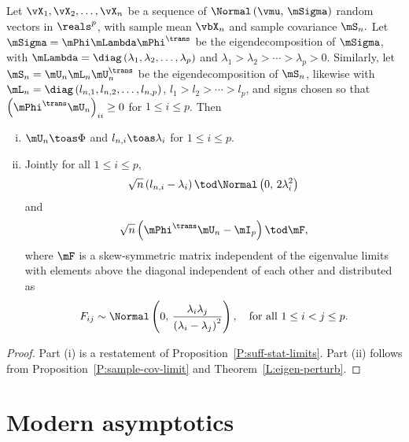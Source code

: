 \begin{theorem}
Let $\vX_1, \vX_2, \ldots, \vX_n$ be a sequence of \iid 
\(
    \Normal \left(
        \vmu, \,
        \mSigma
    \right)
\)
random vectors in $\reals^p$, with sample mean
\(
    \vbX_n
\)
and sample covariance
\(
    \mS_n.
\)
Let $\mSigma = \mPhi \mLambda \mPhi^\trans$ be the eigendecomposition
of $\mSigma$, with
\(
    \mLambda = \diag \left(
        \lambda_1,
        \lambda_2,
        \ldots,
        \lambda_p
    \right)
\)
and
\(
    \lambda_1 > \lambda_2 > \cdots > \lambda_p > 0
\).
Similarly, let $\mS_n = \mU_n \mL_n \mU_n^\trans$ be the eigendecomposition of $\mS_n$, likewise with
\(
    \mL_n = \diag \left(
        l_{n,1},
        l_{n,2},
        \ldots,
        l_{n,p}
    \right)
\),
\(
    l_1 > l_2 > \cdots > l_p
\),
and signs chosen so that
\(
    \left( \mPhi^\trans \mU_n \right)_{ii} \geq 0
\)
for $1 \leq i \leq p$.  Then
\begin{enumerate}[(i)]
    \item $\mU_n \toas \Phi$ and $l_{n,i} \toas \lambda_i$ for
        $1 \leq i \leq p$.
    \item Jointly for all $1 \leq i \leq p$,
        \[
            \sqrt{n} \left( l_{n,i} - \lambda_i \right) 
            \tod 
            \Normal\left( 0, \, 2 \lambda_i^2 \right)
        \]
        and
        \[
            \sqrt{n} \left( \mPhi^\trans \mU_n - \mI_p \right) \tod \mF,
        \]
        where $\mF$ is a skew-symmetric matrix independent of the
        eigenvalue limits with elements above the diagonal independent of
        each other and distributed as 
        \[
            F_{ij}
            \sim
            \Normal \left(
                0, \,
                \frac{\lambda_i \lambda_j}
                     {\left( \lambda_i - \lambda_j \right)^2}
            \right),
            \quad
            \text{for all $1 \leq i < j \leq p$.}
        \]
\end{enumerate}
\end{theorem}
\begin{proof}
Part (i) is a restatement of Proposition~\ref{P:suff-stat-limits}.  Part (ii) follows from Proposition~\ref{P:sample-cov-limit} and Theorem~\ref{L:eigen-perturb}.
\end{proof}


\section{Modern asymptotics}\label{S:multivariate-modern}

